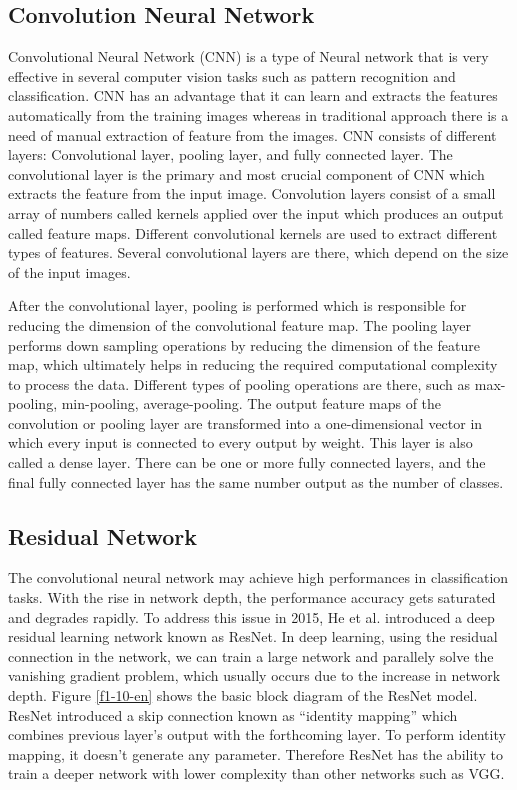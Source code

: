 \subsection{Convolution Neural Network}
Convolutional Neural Network (CNN) is a type of Neural network that is very effective in several computer vision tasks such as pattern recognition and classification. CNN has an advantage that it can learn and extracts the features automatically from the training images whereas in traditional approach there is a need of manual extraction of feature from the images. CNN consists of different layers: Convolutional layer, pooling layer, and fully connected layer. The convolutional layer is the primary and most crucial component of CNN which extracts the feature from the input image. Convolution layers consist of a small array of numbers called kernels applied over the input which produces an output called feature maps. Different convolutional kernels are used to extract different types of features. Several convolutional layers are there, which depend on the size of the input images.

After the convolutional layer, pooling is performed which is responsible for reducing the dimension of the convolutional feature map. The pooling layer performs down sampling operations by reducing the dimension of the feature map, which ultimately helps in reducing the required computational complexity to process the data. Different types of pooling operations are there, such as max-pooling, min-pooling, average-pooling. The output feature maps of the convolution or pooling layer are transformed into a one-dimensional vector in which every input is connected to every output by weight. This layer is also called a dense layer. There can be one or more fully connected layers, and the final fully connected layer has the same number output as the number of classes.

\subsection{Residual Network}
The convolutional neural network may achieve high performances in classification tasks. With the rise in network depth, the performance accuracy gets saturated and degrades rapidly. To address this issue in 2015, He et al.  introduced a deep residual learning network known as ResNet. In deep learning, using the residual connection in the network, we can train a large network and parallely solve the vanishing gradient problem, which usually occurs due to the increase in network depth. Figure \ref{f1-10-en} shows the basic block diagram of the ResNet model. ResNet introduced a skip connection known as “identity mapping” which combines previous layer’s output with the forthcoming layer. To perform identity mapping, it doesn’t generate any parameter. Therefore ResNet has the ability to train a deeper network with lower complexity than other networks such as VGG.

